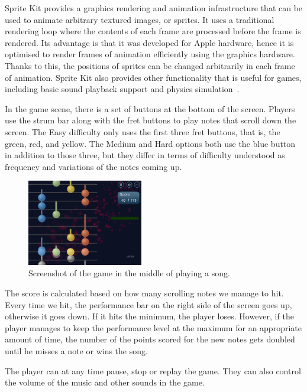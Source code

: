 Sprite Kit provides a graphics rendering and animation infrastructure that can be used to animate arbitrary textured images, or sprites. It uses a traditional rendering loop where the contents of each frame are processed before the frame is rendered. Its advantage is that it was developed for Apple hardware, hence it is optimised to render frames of animation efficiently using the graphics hardware. Thanks to this, the positions of sprites can be changed arbitrarily in each frame of animation. Sprite Kit also provides other functionality that is useful for games, including basic sound playback support and physics simulation~\cite{spritekit}. 

In the game scene, there is a set of buttons at the bottom of the screen. Players use the strum bar along with the fret buttons to play notes that scroll down the screen. The Easy difficulty only uses the first three fret buttons, that is, the green, red, and yellow. The Medium and Hard options both use the blue button in addition to those three, but they differ in terms of difficulty understood as frequency and variations of the notes coming up.


\begin{figure}
  \begin{center}
    \includegraphics[width=0.45\textwidth]{Figures/FullGame}
  \end{center}
  \caption{Screenshot of the game in the middle of playing a song.}
\label{fig:overallgamescreen}
\end{figure}

The score is calculated based on how many scrolling notes we manage to hit. Every time we hit, the performance bar on the right side of the screen goes up, otherwise it goes down. If it hits the minimum, the player loses. However, if the player manages to keep the performance level at the maximum for an appropriate amount of time, the number of the points scored for the new notes gets doubled until he misses a note or wins the song.

The player can at any time pause, stop or replay the game. They can also control the volume of the music and other sounds in the game. 

